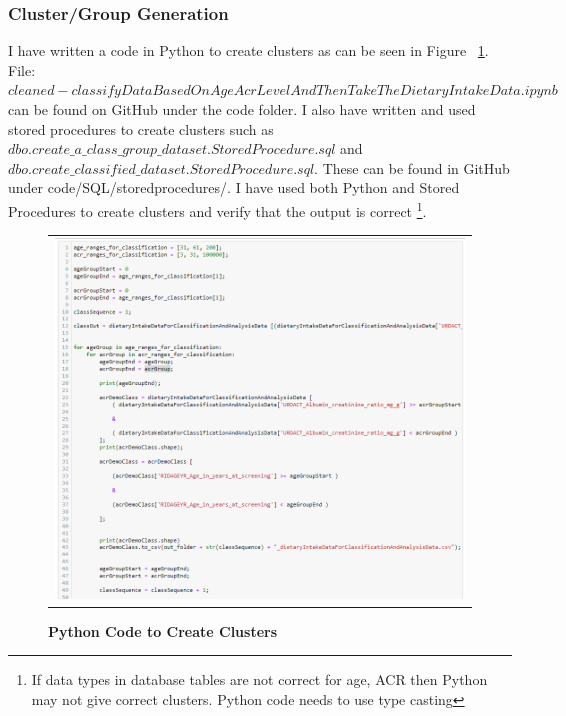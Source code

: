 \subsubsection {Cluster/Group Generation}
\flushleft \justifying I have written a code in Python to create clusters as can be seen in Figure ~\ref{python-cluster}.
File: $cleaned-classifyDataBasedOnAgeAcrLevelAndThenTakeTheDietaryIntakeData.ipynb$ can be found on GitHub under the code folder. I also have written and used stored procedures to create clusters such as
$dbo.create\_a\_class\_group\_dataset.StoredProcedure.sql$ and $dbo.create\_classified\_dataset.StoredProcedure.sql$. These can be found in GitHub under code/SQL/storedprocedures/. I have used both Python and Stored Procedures to create clusters and verify that the output is correct \footnote{If data types in database tables are not correct for age, ACR then Python may not give correct clusters. Python code needs to use type casting}.

\begin{figure}[!htb]
\begin{tabular}{c}
\includegraphics[scale=0.8]{images/datasetgenerationcode/cluster-python-code.png} \\
\end{tabular}
\caption{\textbf{Python Code to Create Clusters}}
\label{python-cluster}
\vspace{0.25cm}
\end{figure}


